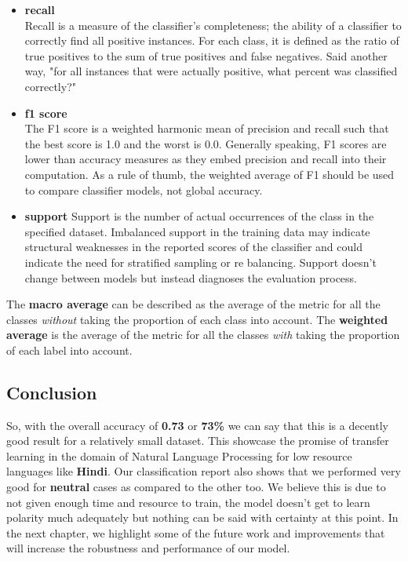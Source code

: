 \documentclass[a4paper, 12pt]{article}
\begin{document}
\begin{sloppypar}
\begin{itemize}
\item{\textbf{recall} \\ 
Recall is a measure of the classifier's completeness; the ability of a classifier to correctly find all positive instances. For each class, it is defined as the ratio of true positives to the sum of true positives and false negatives. Said another way, "for all instances that were actually positive, what percent was classified correctly?"\cite{noauthor_classification_nodate} }
\item{\textbf{f1 score} \\
The F1 score is a weighted harmonic mean of precision and recall such that the best score is 1.0 and the worst is 0.0. Generally speaking, F1 scores are lower than accuracy measures as they embed precision and recall into their computation. As a rule of thumb, the weighted average of F1 should be used to compare classifier models, not global accuracy.\cite{noauthor_classification_nodate}
}
\item{\textbf{support}
Support is the number of actual occurrences of the class in the specified dataset. Imbalanced support in the training data may indicate structural weaknesses in the reported scores of the classifier and could indicate the need for stratified sampling or re balancing. Support doesn't change between models but instead diagnoses the evaluation process.\cite{noauthor_classification_nodate} }
\end{itemize}
The \textbf{macro average} can be described as the average of the metric for all the classes \textit{without} taking the proportion of each class into account. The \textbf{weighted average} is the average of the metric for all the classes \textit{with} taking the proportion of each label into account.

\subsection{Conclusion}

So, with the overall accuracy of \textbf{0.73} or \textbf{73\%} we can say that this is a decently good result for a relatively small dataset. This showcase the promise of transfer learning in the domain of Natural Language Processing for low resource languages like \textbf{Hindi}. Our classification report also shows that we performed very good for \textbf{neutral} cases as compared to the other too. We believe this is due to not given enough time and resource to train, the model doesn't get to learn polarity much adequately but nothing can be said with certainty  at this point. In the next chapter, we highlight some of the future work and improvements that will increase the robustness and performance of our model.
  \clearpage

\end{sloppypar}
\end{document}
